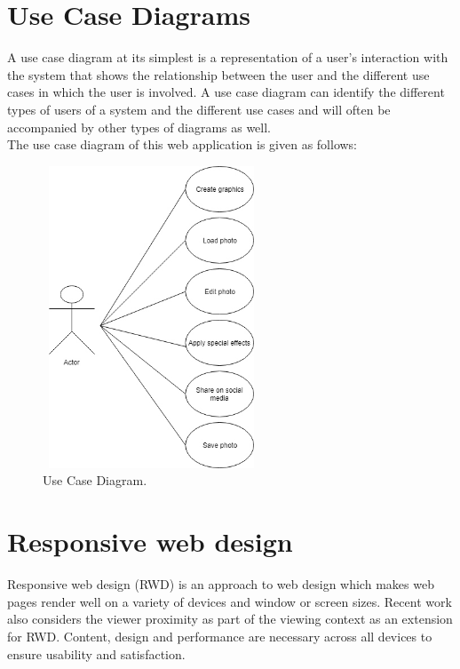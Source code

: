 \documentclass[12pt,a4 paper]{report}
\begin{document}
\section{Use Case Diagrams}
A use case diagram at its simplest is a representation of a user's interaction with the system that shows the relationship between the user and the different use cases in which the user is involved. A use case diagram can identify the different types of users of a system and the different use cases and will often be accompanied by other types of diagrams as well. \\

The use case diagram of this web application is given as follows: \\

\begin{figure}[h]
\begin{center}
\includegraphics[width=6.5cm, height=9cm]{ucd.jpg}
\caption{Use Case Diagram.}
\end{center}
\end{figure}

\section{Responsive web design}
Responsive web design (RWD) is an approach to web design which makes web pages render well on a variety of devices and window or screen sizes. Recent work also considers the viewer proximity as part of the viewing context as an extension for RWD. Content, design and performance are necessary across all devices to ensure usability and satisfaction. \\
\end{document}
